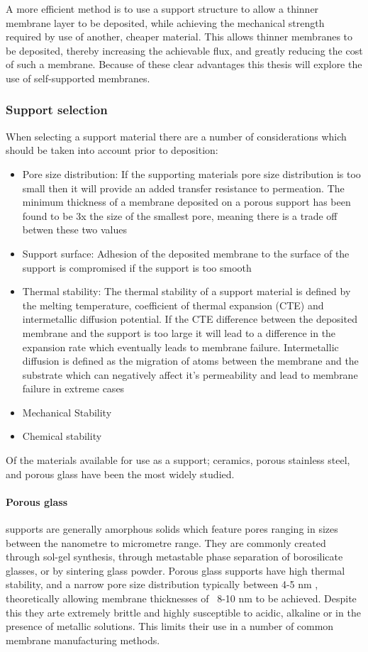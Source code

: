 A more efficient method is to use a support structure to allow a thinner membrane layer to 
be deposited, while achieving the mechanical strength required by use of another, cheaper 
material. This allows thinner membranes to be deposited, thereby increasing the achievable 
flux, and greatly reducing the cost of such a membrane.\cite{NathanW.Ockwig2007a} Because of these clear advantages 
this thesis will explore the use of self-supported membranes. 

\subsubsection{Support selection}
When selecting a support material there are a number of considerations which should be taken 
into account prior to deposition:
\begin{itemize}
\item Pore size distribution: If the supporting materials pore size distribution is too small then it will 
provide an added transfer resistance to permeation. The minimum thickness of a membrane deposited on a porous support has been found to be 3x the size of the smallest pore, \cite{Mardilovich2002} meaning there is a trade off betwen these two values
\item Support surface: Adhesion of the deposited membrane to the surface of the support is 
compromised if the support is too smooth
\item Thermal stability: The thermal stability of a support material is defined by the 
melting temperature, coefficient of thermal expansion (CTE) and intermetallic diffusion 
potential. If the CTE difference between the deposited membrane and the support is too large 
it will lead to a difference in the expansion rate which eventually leads to membrane failure. Intermetallic diffusion is defined as the migration of atoms between the membrane and the substrate which can negatively affect it’s permeability and lead to membrane failure in extreme cases
\item Mechanical Stability
\item Chemical stability
\end{itemize}
Of the materials available for use as a support; ceramics, porous stainless steel, and porous glass have been the most widely studied. 

\paragraph*{Porous glass} supports are generally amorphous solids which feature pores ranging in sizes between the nanometre to micrometre range. They are commonly created through sol-gel synthesis, through metastable phase separation of borosilicate glasses, or by sintering glass powder. Porous glass supports have high thermal stability, and a narrow pore size distribution typically between 4-5 nm \cite{SCHLUNDER2006113} \cite{UEMIYA1991303}, theoretically allowing membrane thicknesses of ~8-10 nm to be achieved. \cite{Mardilovich2002} Despite this they arte extremely brittle and highly susceptible to acidic, alkaline or in the presence of metallic solutions. This limits their use in a number of common membrane manufacturing methods. 

